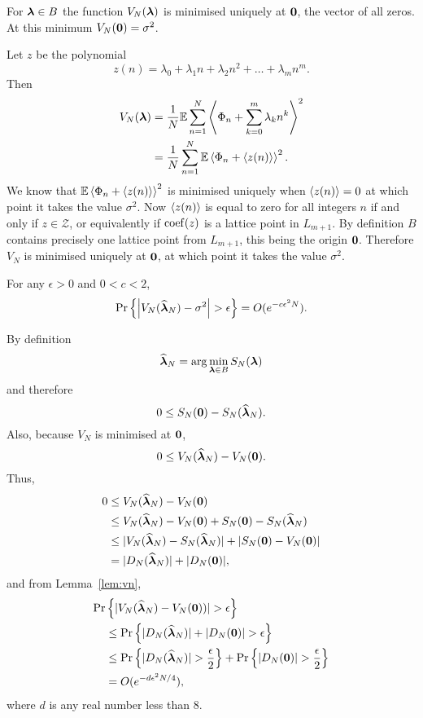 \documentclass[journal]{IEEEtran}
\begin{document}
\begin{lemma}\label{lem:ES_Nminimisedzero}
For $\boldsymbol{\lambda} \in B$ the function $V_N(\boldsymbol{\lambda})$ is minimised uniquely at $\boldsymbol{0}$, the vector of all zeros.  At this minimum $V_N(\boldsymbol{0}) = \sigma^2$.
\end{lemma}
\begin{IEEEproof}
Let $z$ be the polynomial
\[
z(n) = \lambda_0 + \lambda_1 n + \lambda_2 n^2 + \dots + \lambda_m n^m.
\]
Then
\begin{align*}
V_N(\boldsymbol{\lambda}) &= \frac{1}{N}{\mathbb E}\sum_{n=1}^{N}\left\langle  \Phi_n + \sum_{k=0}^m{\lambda_k n^k}  \right\rangle^2 \\
&= \frac{1}{N}\sum_{n=1}^{N}{\mathbb E}\left\langle  \Phi_n + \left\langle z(n) \right\rangle  \right\rangle^2.
\end{align*}
We know that ${\mathbb E}\left\langle  \Phi_n + \left\langle z(n) \right\rangle  \right\rangle^2$ is minimised uniquely when $\left\langle z(n) \right\rangle = 0$ at which point it takes the value $\sigma^2$. Now $\left\langle z(n) \right\rangle$ is equal to zero for all integers $n$ if and only if $z \in \mathcal{Z}$, or equivalently if $\operatorname{coef}(z)$ is a lattice point in $L_{m+1}$. By definition $B$ contains precisely one lattice point from $L_{m+1}$, this being the origin $\boldsymbol{0}$. Therefore $V_N$ is minimised uniquely at $\boldsymbol{0}$, at which point it takes the value $\sigma^2$.
\end{IEEEproof}

\begin{lemma} \label{lem:ESNconv}
For any $\epsilon > 0$ and $0 < c < 2$,
\[
\operatorname{Pr}\left\{ \left\vert V_N(\widehat{\boldsymbol{\lambda}}_N) - \sigma^2 \right\vert > \epsilon \right\} = O(e^{-c \epsilon^2 N}).
\]
\end{lemma}
\begin{IEEEproof}
By definition
\[
\widehat{\boldsymbol{\lambda}}_N =\arg\min_{\boldsymbol{\lambda}\in B} S_N(\boldsymbol{\lambda})
\]
and therefore
\[
 0 \leq S_{N}(\boldsymbol{0}) - S_N(\widehat{\boldsymbol{\lambda}}_N).
\]
Also, because $V_N$ is minimised at $\boldsymbol{0}$,
\[
 0 \leq V_N(\widehat{\boldsymbol{\lambda}}_N) - V_N(\boldsymbol{0}).
\]
Thus,
\begin{align*}
0 &\leq V_N(\widehat{\boldsymbol{\lambda}}_N) - V_N(\boldsymbol{0})  \\
&\leq V_N(\widehat{\boldsymbol{\lambda}}_N) - V_N(\boldsymbol{0}) + S_{N}(\boldsymbol{0}) - S_N(\widehat{\boldsymbol{\lambda}}_N)   \\
&\leq \vert  V_N(\widehat{\boldsymbol{\lambda}}_N) - S_N(\widehat{\boldsymbol{\lambda}}_N)  \vert + \vert  S_{N}(\boldsymbol{0}) - V_N(\boldsymbol{0})  \vert\\
&= \vert  D_N(\widehat{\boldsymbol{\lambda}}_N)  \vert + \vert  D_N(\boldsymbol{0})  \vert,
\end{align*}
and from Lemma~\ref{lem:vn},
\begin{align*}
\operatorname{Pr}&\left\{ \vert V_N(\widehat{\boldsymbol{\lambda}}_N) - V_N(\boldsymbol{0})) \vert > \epsilon \right\} \\
&\leq \operatorname{Pr}\left\{ \vert  D_N(\widehat{\boldsymbol{\lambda}}_N)  \vert + \vert  D_N(\boldsymbol{0})  \vert > \epsilon \right\} \\
&\leq \operatorname{Pr}\left\{ \vert  D_N(\widehat{\boldsymbol{\lambda}}_N)  \vert > \frac{\epsilon}{2}\right\} + \operatorname{Pr}\left\{ \vert  D_N(\boldsymbol{0})  \vert > \frac{\epsilon}{2} \right\} \\
&= O(e^{-d \epsilon^2 N / 4}),
\end{align*}
where $d$ is any real number less than $8$.
\end{IEEEproof}
\end{document}
